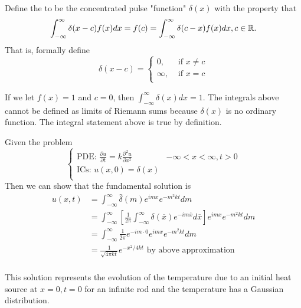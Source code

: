 \documentclass[class=article,crop=false]{standalone}
\begin{document}
\begin{defn}
	Define the  to be the concentrated pulse "function" $ \delta(x)$ with the property that
	\[
		\int_{-\infty}^{\infty} \delta(x-c) f(x) dx = f(c) = \int_{-\infty}^{\infty} \delta(c-x) f(x) dx, c \in \mathbb{R}  
	.\] 
	That is, formally define
	\begin{equation*}
		\delta(x-c)=
	\begin{cases}
		0,& \text{ if } x\neq c\\
		\infty,& \text{ if } x=c\\ 
	\end{cases}
	\end{equation*}
\end{defn}
\begin{note}[]
	If we let $ f(x) =1$ and  $ c=0$, then  $ \int_{-\infty}^{\infty} \delta(x) dx =1 $. The integrals above cannot be defined as limits of Riemann sums because $ \delta(x)$ is no ordinary function. The integral statement above is true by definition.
\end{note}

\begin{thm}
Given the problem
\begin{equation*}
\begin{cases}
	\text{PDE: } \frac{\partial u}{\partial t} =k\frac{\partial^2 u}{\partial { x}^2}  & -\infty<x<\infty, t>0 \\
	\text{ICs: } u(x,0) = \delta(x) & \\
\end{cases}
\end{equation*}
Then we can show that the fundamental solution is
\begin{align*}
	u(x,t) &= \int_{-\infty}^{\infty} \hat{ \delta}(m) e^{imx} e^{-m^2 kt}  dm \\
	       &= \int_{-\infty}^{\infty} \left[ \frac{1}{2\pi} \int_{-\infty}^{\infty} \delta( \overline{x}) e^{-im \overline{x}} d \overline{x}  \right]  e^{imx} e^{-m^2 kt} d m \\
	       &= \int_{-\infty}^{\infty} \frac{1}{2\pi} e^{-im \cdot  0} e^{imx} e^{-m^2 kt} d m \\
	       &= \frac{1}{\sqrt{4\pi kt} } e^{-x^2 /4kt} \text{ by above approximation} \\
\end{align*} 
\end{thm}
\begin{remark}
This solution represents the evolution of the temperature due to an initial heat source at $ x=0, t=0$ for an infinite rod and the temperature has a Gaussian distribution.
\end{remark}
\end{document}
